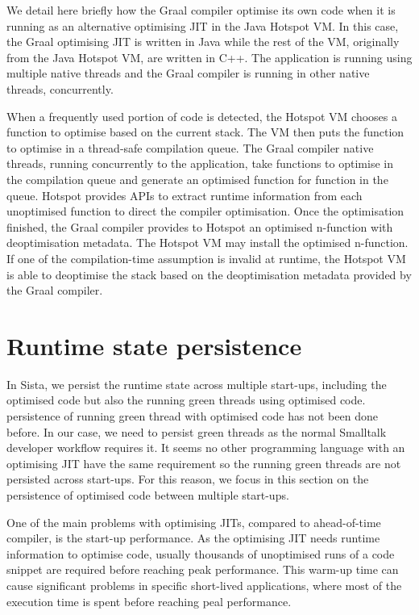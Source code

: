 \documentclass[a4paper,12pt,twoside]{../includes/ThesisStyle}
\begin{document}
We detail here briefly how the Graal compiler optimise its own code when it is running as an alternative optimising JIT in the Java Hotspot VM. In this case, the Graal optimising JIT is written in Java while the rest of the VM, originally from the Java Hotspot VM, are written in C++. The application is running using multiple native threads and the Graal compiler is running in other native threads, concurrently.

When a frequently used portion of code is detected, the Hotspot VM chooses a function to optimise based on the current stack. The VM then puts the function to optimise in a thread-safe compilation queue. The Graal compiler native threads, running concurrently to the application, take functions to optimise in the compilation queue and generate an optimised function for function in the queue. Hotspot provides APIs to extract runtime information from each unoptimised function to direct the compiler optimisation. Once the optimisation finished, the Graal compiler provides to Hotspot an optimised n-function with deoptimisation metadata. The Hotspot VM may install the optimised n-function. If one of the compilation-time assumption is invalid at runtime, the Hotspot VM is able to deoptimise the stack based on the deoptimisation metadata provided by the Graal compiler.


\section{Runtime state persistence}
\label{sec:persistence}

In Sista, we persist the runtime state across multiple start-ups, including the optimised code but also the running green threads using optimised code. persistence of running green thread with optimised code has not been done before. In our case, we need to persist green threads as the normal Smalltalk developer workflow requires it. It seems no other programming language with an optimising JIT have the same requirement so the running green threads are not persisted across start-ups. For this reason, we focus in this section on the persistence of optimised code between multiple start-ups.

One of the main problems with optimising JITs, compared to ahead-of-time compiler, is the start-up performance. As the optimising JIT needs runtime information to optimise code, usually thousands of unoptimised runs of a code snippet are required before reaching peak performance. This warm-up time can cause significant problems in specific short-lived applications, where most of the execution time is spent before reaching peal performance. 
\end{document}

